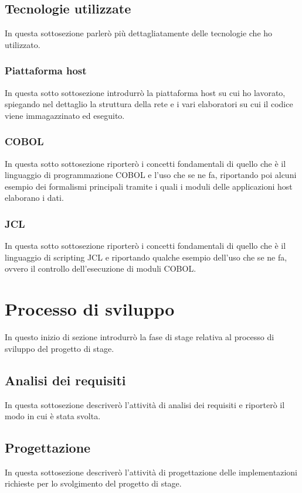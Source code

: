 \subsection{Tecnologie utilizzate}
In questa sottosezione parlerò più dettagliatamente delle tecnologie che ho utilizzato.

\subsubsection{Piattaforma host}
In questa sotto sottosezione introdurrò la piattaforma host su cui ho lavorato, spiegando nel dettaglio la struttura della rete e i vari elaboratori su cui il codice viene immagazzinato ed eseguito.
	
\subsubsection{COBOL}
In questa sotto sottosezione riporterò i concetti fondamentali di quello che è il linguaggio di programmazione COBOL e l'uso che se ne fa, riportando poi alcuni esempio dei formalismi principali tramite i quali i moduli delle applicazioni host elaborano i dati.
	
\subsubsection{JCL}
In questa sotto sottosezione riporterò i concetti fondamentali di quello che è il linguaggio di scripting JCL e riportando qualche esempio dell'uso che se ne fa, ovvero il controllo dell'esecuzione di moduli COBOL.

\section{Processo di sviluppo}
In questo inizio di sezione introdurrò la fase di stage relativa al processo di sviluppo del progetto di stage.

\subsection{Analisi dei requisiti}
In questa sottosezione descriverò l'attività di analisi dei requisiti e riporterò il modo in cui è stata svolta.

\subsection{Progettazione}
In questa sottosezione descriverò l'attività di progettazione delle implementazioni richieste per lo svolgimento del progetto di stage.
		
